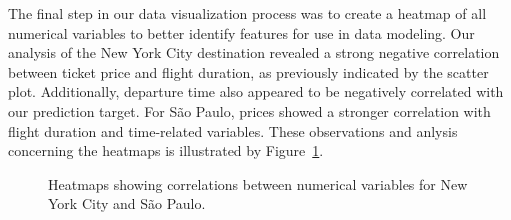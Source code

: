 The final step in our data visualization process was to create a heatmap of all numerical variables to better identify features for use in data modeling.
Our analysis of the New York City destination revealed a strong negative correlation between ticket price and flight duration, as previously indicated by the scatter plot.
Additionally, departure time also appeared to be negatively correlated with our prediction target.
For São Paulo, prices showed a stronger correlation with flight duration and time-related variables.
These observations and anlysis concerning the heatmaps is illustrated by Figure~\ref{fig:heat}.
\begin{figure}
    \centering
    \caption{Heatmaps showing correlations between numerical variables for New York City and São Paulo.}
    \label{fig:heat}
\end{figure}




